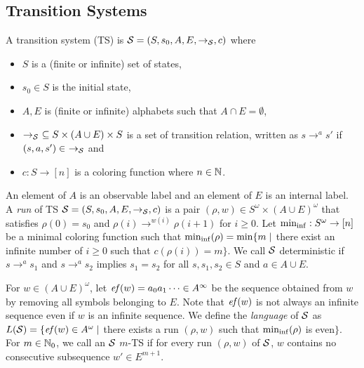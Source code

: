 \subsection{Transition Systems}
\begin{definition}
A {transition system} (TS)
is ${\cal S}=(S, s_0, A, E, \to_{\cal S}, c)$ where
\begin{itemize}
\item $S$ is a (finite or infinite) set of states,
\item $s_0\in S$ is the initial state,
\item $A, E$ is (finite or infinite) alphabets such that $A\cap E = \emptyset$,
\item $\to_{\cal S}\ \subseteq S\times(A\cup E)\times S$ is a set of transition relation, written as $s\to^a s'$ if $(s,a,s')\in\ \to_{\cal S}$ and
\item $c: S \to [n]$ is a coloring function where $n\in \mathbb{N}$.
\end{itemize}
\end{definition}
An element of $A$ is an observable label and an element of $E$ is an internal label.
A \emph{run} of TS ${\cal S}=(S, s_0, A, E, \to_{\cal S}, c)$ is
a pair $(\rho, w)\in S^\omega \times (A\cup E)^\omega$ that satisfies
$\rho(0)=s_0$ and $\rho(i)\to^{w(i)}\rho(i+1)$ for $i\geq 0$.
Let ${\rm min_{inf}}: S^\omega \to [n]$ be a minimal coloring function such that
${\rm min_{inf}}(\rho)={\rm min}\{m\mid$ there exist an infinite number of $i\geq 0$ such that $c(\rho(i)) = m\}$.
We call ${\cal S}$ deterministic if $s\to^a s_1$ and $s\to^a s_2$ implies $s_1=s_2$ for all $s,s_1,s_2\in S$ and $a\in A\cup E$.

For $w\in (A\cup E)^\omega$, let
$\mathit{ef}(w) = a_0a_1\cdots\in A^\infty$ be the sequence obtained from $w$ by removing all symbols belonging to $E$.
Note that $\mathit{ef}(w)$ is not always an infinite sequence even if $w$ is an infinite sequence.
We define the \emph{language} of ${\cal S}$ as
$L({\cal S})=\{\mathit{ef}(w)\in A^\omega\mid$
there exists a run $(\rho,w)$ such that ${\rm min_{inf}}(\rho)$ is even$\}$.
For $m\in\mathbb{N}_0$, we call an ${\cal S}$ $m$-TS
if for every run $(\rho,w)$ of ${\cal S}$,
$w$ contains no consecutive subsequence $w'\in E^{m+1}$.



